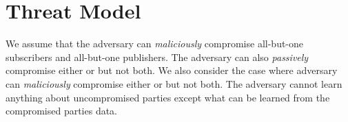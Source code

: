\section{Threat Model}
\label{sec:threatmodel}

We assume that the adversary can \emph{maliciously} compromise all-but-one
subscribers and all-but-one publishers. The adversary can also \emph{passively}
compromise either \broker or \garbler but not both. We also consider the case
where adversary can \emph{maliciously} compromise either \broker or \garbler but
not both. The adversary cannot learn anything about uncompromised parties
except what can be learned from the compromised parties data.  
